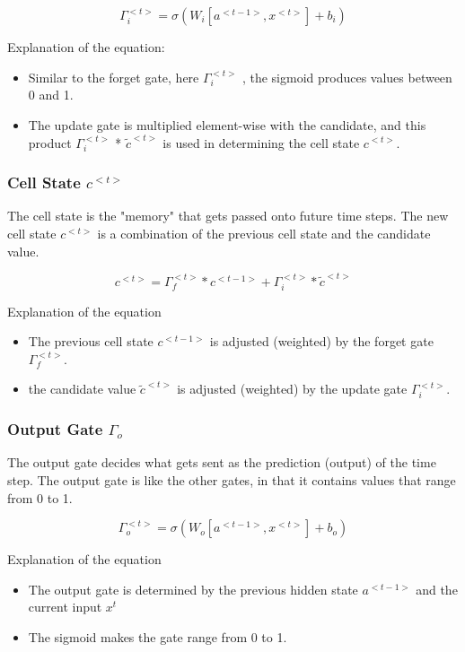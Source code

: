\begin{equation}
    \Gamma _i ^ {<t>} = \sigma (W_i[a^{<t - 1>}, x^{<t>}] + b_i)
\end{equation}

Explanation of the equation:
\begin{itemize}
    \item Similar to the forget gate, here $\Gamma _i ^{<t>}$
          , the sigmoid produces values between 0 and 1.
    \item The update gate is multiplied element-wise with the candidate, and this product $\Gamma _i ^{<t>}$ * $\tilde{c}^{<t>}$ is used in determining the cell state $c^{<t>}$.
\end{itemize}

\subsubsection{Cell State $c^{<t>}$}
The cell state is the "memory" that gets passed onto future time steps.
The new cell state $c^{<t>}$ is a combination of the previous cell state and the candidate value.

\begin{equation}
    c^{<t>} = \Gamma _f ^{<t>} * c^{<t - 1>} + \Gamma _i ^{<t>} * \tilde{c}^{<t>}
\end{equation}

Explanation of the equation
\begin{itemize}
    \item The previous cell state $c^{<t - 1>}$
          is adjusted (weighted) by the forget gate $\Gamma _f ^{<t>}$.
    \item the candidate value $\tilde{c}^{<t>}$ is adjusted (weighted) by the update gate $\Gamma _i ^{<t>}$.
\end{itemize}

\subsubsection{Output Gate $\Gamma _o$}
The output gate decides what gets sent as the prediction (output) of the time step. The output gate is like the other gates, in that it contains values that range from 0 to 1.

\begin{equation}
    \Gamma _o ^ {<t>} = \sigma (W_o[a^{<t - 1>}, x^{<t>}] + b_o)
\end{equation}

Explanation of the equation
\begin{itemize}
    \item The output gate is determined by the previous hidden state $a^{<t - 1>}$ and the current input $x^{t}$
    \item The sigmoid makes the gate range from 0 to 1.
\end{itemize}

